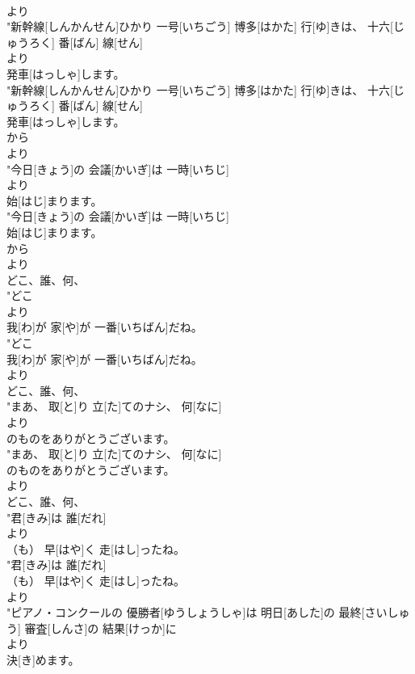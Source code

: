 \documentclass[8pt]{extreport}
\begin{document}
\begin{CJK}{UTF8}{min}
\\	より
\\	"新幹線[しんかんせん]ひかり 一号[いちごう] 博多[はかた] 行[ゆ]きは、 十六[じゅうろく] 番[ばん] 線[せん]
\\	より
\\	発車[はっしゃ]します。
\\	"新幹線[しんかんせん]ひかり 一号[いちごう] 博多[はかた] 行[ゆ]きは、 十六[じゅうろく] 番[ばん] 線[せん]
\\	発車[はっしゃ]します。
\\	から 
\\	より
\\	"今日[きょう]の 会議[かいぎ]は 一時[いちじ]
\\	より
\\	始[はじ]まります。
\\	"今日[きょう]の 会議[かいぎ]は 一時[いちじ]
\\	始[はじ]まります。
\\	から 
\\	より
\\	どこ、誰、何、
\\	"どこ
\\	より
\\	我[わ]が 家[や]が 一番[いちばん]だね。
\\	"どこ
\\	我[わ]が 家[や]が 一番[いちばん]だね。
\\	より
\\	どこ、誰、何、
\\	"まあ、 取[と]り 立[た]てのナシ、 何[なに]
\\	より
\\	のものをありがとうございます。
\\	"まあ、 取[と]り 立[た]てのナシ、 何[なに]
\\	のものをありがとうございます。
\\	より
\\	どこ、誰、何、
\\	"君[きみ]は 誰[だれ]
\\	より
\\	（も） 早[はや]く 走[はし]ったね。
\\	"君[きみ]は 誰[だれ]
\\	（も） 早[はや]く 走[はし]ったね。
\\	より
\\	"ピアノ・コンクールの 優勝者[ゆうしょうしゃ]は 明日[あした]の 最終[さいしゅう] 審査[しんさ]の 結果[けっか]に
\\	より
\\	決[き]めます。

\end{CJK}
\end{document}
